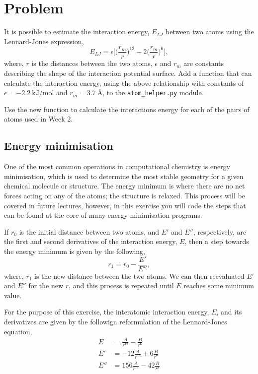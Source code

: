 \documentclass[a4paper]{article}
\begin{document}
\section{Problem}

It is possible to estimate the interaction energy, $E_{LJ}$ between two atoms using the Lennard-Jones expression,
\begin{equation}
  E_{LJ} = \epsilon \bigg[\Big(\frac{r_m}{r}\Big)^{12} - 2\Big(\frac{r_m}{r}\Big)^6\bigg],
\end{equation}
where, $r$ is the distances between the two atoms, $\epsilon$ and $r_m$ are constants describing the shape of the interaction potential surface.
Add a function that can calculate the interaction energy, using the above relationship with constants of $\epsilon = \SI{-2.2}{\kilo\joule\per\mol}$ and $r_m = \SI{3.7}{\angstrom}$, to the \texttt{atom\_helper.py} module.

Use the new function to calculate the interactions energy for each of the pairs of atoms used in Week 2.

\subsection{Energy minimisation}

One of the most common operations in computational chemistry is energy minimisation, which is used to determine the most stable geometry for a given chemical molecule or structure.
The energy minimum is where there are no net forces acting on any of the atoms; the structure is relaxed.
This process will be covered in future lectures, however, in this exercise you will code the steps that can be found at the core of many energy-minimisation programs.

If $r_0$ is the initial distance between two atoms, and $E'$ and $E''$, respectively, are the first and second derivatives of the interaction energy, $E$, then a step towards the energy minimum is given by the following,
\begin{equation}
  r_1 = r_0 - \frac{E'}{E''},
\end{equation}
where, $r_1$ is the new distance between the two atoms.
We can then reevaluated $E'$ and $E''$ for the new $r$, and this process is repeated until $E$ reaches some minimum value.

For the purpose of this exercise, the interatomic interaction energy, $E$, and its derivatives are given by the followign reformulation of the Lennard-Jones equation,
\begin{equation}
  \begin{aligned}
    E & = \frac{A}{r^{12}} - \frac{B}{r^6} \\
    E' & = -12\frac{A}{r^{13}} + 6\frac{B}{r^7} \\
    E'' & = 156\frac{A}{r^{14}} - 42\frac{B}{r^8} \\
  \end{aligned}
\end{equation}
\end{document}
